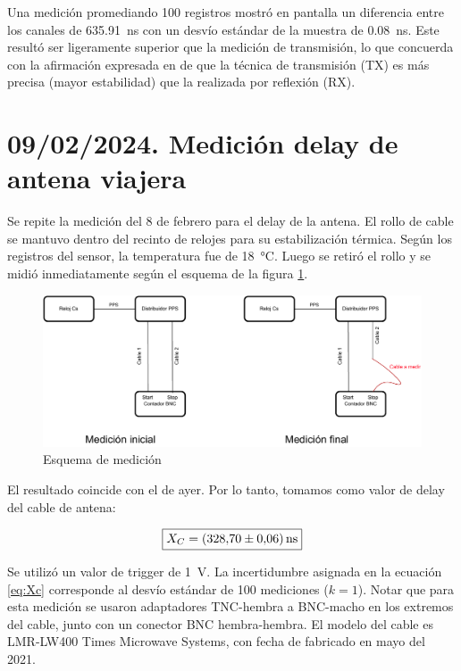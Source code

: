 \documentclass[11pt]{article}
\begin{document}
Una medición promediando 100 registros mostró en pantalla un diferencia entre los canales de \SI{635.91}{\nano\second} con un desvío estándar de la muestra de \SI{0.08}{\nano\second}.
Este resultó ser ligeramente superior que la medición de transmisión, lo que concuerda con la afirmación expresada en \cite{rovera_techniques_2015} de que la técnica de transmisión (TX) es más precisa (mayor estabilidad) que la realizada por reflexión (RX).

\section{09/02/2024. Medición delay de antena viajera}

Se repite la medición del 8 de febrero para el delay de la antena. El rollo de cable se mantuvo dentro del recinto de relojes para su estabilización térmica. Según los registros del sensor, la temperatura fue de \SI{18}{\celsius}. Luego se retiró el rollo y se midió inmediatamente según el esquema de la figura \ref{fig:cabledelay}. 


\begin{figure}[ht]
    \begin{center}
        \includegraphics[width=1\textwidth]{./figuras/cabledelay}
        \caption{Esquema de medición}
        \label{fig:cabledelay}
    \end{center}
\end{figure}

El resultado coincide con el de ayer. Por lo tanto, tomamos como valor de delay del cable de antena:


\begin{equation}
\boxed{X_C=\SI{328,7(0,06)}{\nano\second}}\label{eq:Xc} 
\end{equation}

Se utilizó un valor de trigger de \SI{1}{\volt}. La incertidumbre asignada en la ecuación \ref{eq:Xc} corresponde al desvío estándar de 100 mediciones ($k=1$). Notar que para esta medición se usaron adaptadores TNC-hembra a BNC-macho en los extremos del cable, junto con un conector BNC hembra-hembra.
El modelo del cable es LMR-LW400 Times Microwave Systems, con fecha de fabricado en mayo del 2021.
\end{document}
